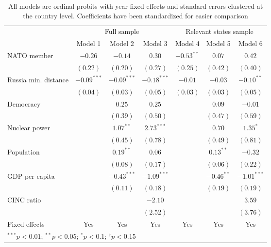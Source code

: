 
\begin{table}[h]
\begin{center}
\begin{tabular}{l c c c c c c}
\hline
 & \multicolumn{3}{c}{Full sample} & \multicolumn{3}{c}{Relevant states sample} \\
\cline{2-4} \cline{5-7}
 & Model 1 & Model 2 & Model 3 & Model 4 & Model 5 & Model 6 \\
\hline
NATO member          & $-0.26$       & $-0.14$       & $0.30$        & $-0.53^{**}$ & $0.07$       & $0.42$        \\
                     & $(0.22)$      & $(0.20)$      & $(0.27)$      & $(0.25)$     & $(0.42)$     & $(0.40)$      \\
Russia min. distance & $-0.09^{***}$ & $-0.09^{***}$ & $-0.18^{***}$ & $-0.01$      & $-0.03$      & $-0.10^{**}$  \\
                     & $(0.04)$      & $(0.03)$      & $(0.05)$      & $(0.03)$     & $(0.03)$     & $(0.05)$      \\
Democracy            &               & $0.25$        & $0.25$        &              & $0.09$       & $-0.01$       \\
                     &               & $(0.39)$      & $(0.50)$      &              & $(0.47)$     & $(0.59)$      \\
Nuclear power        &               & $1.07^{**}$   & $2.73^{***}$  &              & $0.70$       & $1.35^{*}$    \\
                     &               & $(0.45)$      & $(0.78)$      &              & $(0.49)$     & $(0.81)$      \\
Population           &               & $0.19^{**}$   & $0.06$        &              & $0.13^{**}$  & $-0.32$       \\
                     &               & $(0.08)$      & $(0.17)$      &              & $(0.06)$     & $(0.22)$      \\
GDP per capita       &               & $-0.43^{***}$ & $-1.09^{***}$ &              & $-0.46^{**}$ & $-1.01^{***}$ \\
                     &               & $(0.11)$      & $(0.18)$      &              & $(0.19)$     & $(0.19)$      \\
CINC ratio           &               &               & $-2.10$       &              &              & $3.59$        \\
                     &               &               & $(2.52)$      &              &              & $(3.76)$      \\
\hline
Fixed effects        & Yes           & Yes           & Yes           & Yes          & Yes          & Yes           \\
\hline
\multicolumn{7}{l}{\scriptsize{$^{***}p<0.01$; $^{**}p<0.05$; $^{*}p<0.1$; $^{\dagger}p<0.15$}}
\end{tabular}
\caption{All models are ordinal probits with year fixed effects and standard errors clustered at the country level. Coefficients have been standardized for easier comparison}
\label{table:model}
\end{center}
\end{table}
